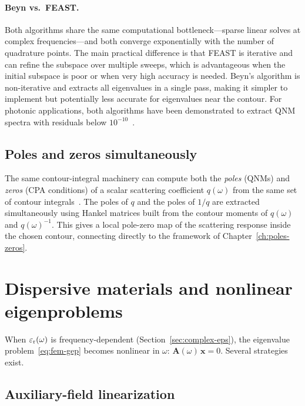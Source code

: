 \paragraph{Beyn vs.\ FEAST.}
Both algorithms share the same computational bottleneck---sparse linear
solves at complex frequencies---and both converge exponentially with
the number of quadrature points. The main practical difference is that
FEAST is iterative and can refine the subspace over multiple sweeps,
which is advantageous when the initial subspace is poor or when very
high accuracy is needed. Beyn's algorithm is non-iterative and
extracts all eigenvalues in a single pass, making it simpler to
implement but potentially less accurate for eigenvalues near the
contour. For photonic applications, both algorithms have been
demonstrated to extract QNM spectra with residuals below
$10^{-10}$~\cite{wu2026rigorous}.

\subsection{Poles and zeros simultaneously}
\label{ssec:poles-zeros}

The same contour-integral machinery can compute both the
\emph{poles} (QNMs) and \emph{zeros} (CPA conditions) of a scalar
scattering coefficient $q(\omega)$ from the same set of contour
integrals~\cite{berlin2024poles}. The poles of $q$ and the poles of
$1/q$ are extracted simultaneously using Hankel matrices built from the
contour moments of $q(\omega)$ and $q(\omega)^{-1}$. This gives a
local pole-zero map of the scattering response inside the chosen contour,
connecting directly to the framework of
Chapter~\ref{ch:poles-zeros}.


\section{Dispersive materials and nonlinear eigenproblems}
\label{sec:dispersive-evp}

When $\varepsilon_{\mathrm{r}}(\omega)$ is frequency-dependent (Section~\ref{sec:complex-eps}),
the eigenvalue problem~\eqref{eq:fem-gep} becomes nonlinear in $\omega$:
$\mathbf{A}(\omega)\,\mathbf{x} = 0$. Several strategies exist.

\subsection{Auxiliary-field linearization}
\label{ssec:aux-linearization}

